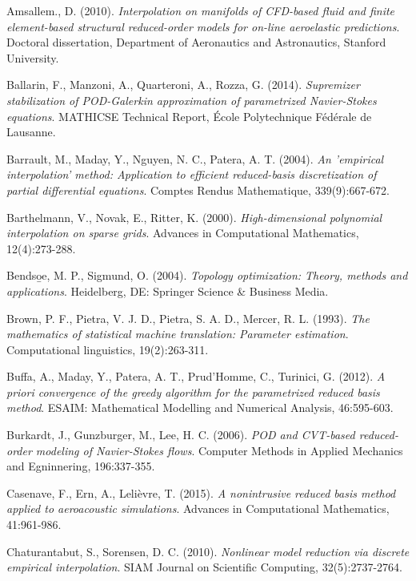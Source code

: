 \documentclass[12pt, a4paper, twoside, openright, notitlepage]{report}
\numberwithin{equation}{chapter}
\theoremstyle{theorem}
\theoremstyle{definition}
\theoremstyle{remark}
\theoremstyle{proposition}
\numberwithin{figure}{chapter}
\begin{document}
						
	\begin{thebibliography}{50}
	
		Amsallem., D. (2010). \emph{Interpolation on manifolds of CFD-based fluid and finite element-based structural reduced-order models for on-line aeroelastic predictions}. Doctoral dissertation, Department of Aeronautics and Astronautics, Stanford University.
		
		Ballarin, F., Manzoni, A., Quarteroni, A., Rozza, G. (2014). \emph{Supremizer stabilization of POD-Galerkin approximation of parametrized Navier-Stokes equations}. MATHICSE Technical Report, \'Ecole Polytechnique F\'ed\'erale de Lausanne.
	
		Barrault, M., Maday, Y., Nguyen, N. C., Patera, A. T. (2004). \emph{An 'empirical interpolation' method: Application to efficient reduced-basis discretization of partial differential equations}. Comptes Rendus Mathematique, 339(9):667-672.
		
		Barthelmann, V., Novak, E., Ritter, K. (2000). \emph{High-dimensional polynomial interpolation on sparse grids}. Advances in Computational Mathematics, 12(4):273-288.
		
		Bends\b{o}e, M. P., Sigmund, O. (2004). \emph{Topology optimization: Theory, methods and applications}. Heidelberg, DE: Springer Science \& Business Media. 
		
		Brown, P. F., Pietra, V. J. D., Pietra, S. A. D., Mercer, R. L. (1993). \emph{The mathematics of statistical machine translation: Parameter estimation}. Computational linguistics, 19(2):263-311.
		
		Buffa, A., Maday, Y., Patera, A. T., Prud'Homme, C., Turinici, G. (2012). \emph{A priori convergence of the greedy algorithm for the parametrized reduced basis method}. ESAIM: Mathematical Modelling and Numerical Analysis, 46:595-603.
		
		Burkardt, J., Gunzburger, M., Lee, H. C. (2006). \emph{POD and CVT-based reduced-order modeling of Navier-Stokes flows}. Computer Methods in Applied Mechanics and Egninnering, 196:337-355.
		
		Casenave, F., Ern, A., Lelièvre, T. (2015). \emph{A nonintrusive reduced basis method applied to aeroacoustic simulations}. Advances in Computational Mathematics, 41:961-986.
		
		Chaturantabut, S., Sorensen, D. C. (2010). \emph{Nonlinear model reduction via discrete empirical interpolation}. SIAM Journal on Scientific Computing, 32(5):2737-2764.
		

\end{thebibliography}
\end{document}
